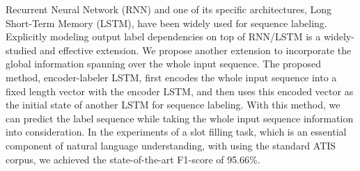 Recurrent Neural Network (RNN) and one of its specific architectures, Long Short-Term Memory (LSTM), have been widely used for sequence labeling. Explicitly modeling output label dependencies on top of RNN/LSTM is a widely-studied and effective extension. We propose another extension to incorporate the global information spanning over the whole input sequence. The proposed method, encoder-labeler LSTM, first encodes the whole input sequence into a fixed length vector with the encoder LSTM, and then uses this encoded vector as the initial state of another LSTM for sequence labeling. With this method, we can predict the label sequence while taking the whole input sequence information into consideration. In the experiments of a slot filling task, which is an essential component of natural language understanding, with using the standard ATIS corpus, we achieved the state-of-the-art F1-score of 95.66\%.
